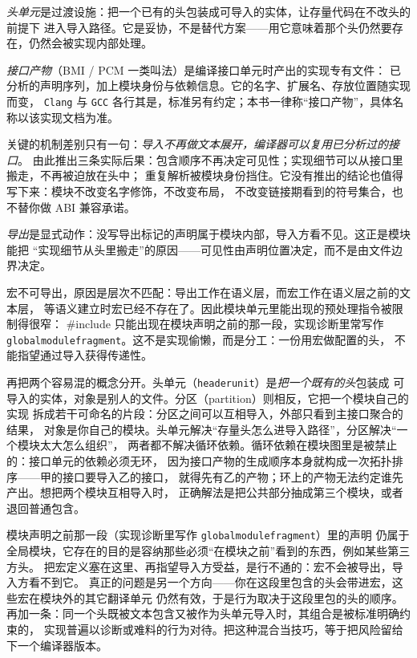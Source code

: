 \documentclass[12pt,a4paper,fontset=fandol]{ctexbook}
\newcommand{\Tp}[1]{\texttt{#1}}
\newcommand{\Bk}{\discretionary{}{}{}}
\newcommand{\Tool}[1]{\texttt{#1}}
\newcommand{\Mx}[1]{\textsf{#1}}
\begin{document}
\emph{头单元}是过渡设施：把一个已有的头包装成可导入的实体，让存量代码在不改头的前提下
进入导入路径。它是妥协，不是替代方案——用它意味着那个头仍然要存在，仍然会被实现内部处理。

\emph{接口产物}（\Mx{BMI} / \Mx{PCM} 一类叫法）是编译接口单元时产出的实现专有文件：
已分析的声明序列，加上模块身份与依赖信息。它的名字、扩展名、存放位置随实现而变，
\Tool{Clang} 与 \Tool{GCC} 各行其是，标准另有约定；本书一律称“接口产物”，具体名称以该实现文档为准。

关键的机制差别只有一句：\emph{导入不再做文本展开，编译器可以复用已分析过的接口}。
由此推出三条实际后果：包含顺序不再决定可见性；实现细节可以从接口里搬走，不再被迫放在头中；
重复解析被模块身份挡住。它没有推出的结论也值得写下来：模块不改变名字修饰，不改变布局，
不改变链接期看到的符号集合，也不替你做 ABI 兼容承诺。

\emph{导出}是显式动作：没写导出标记的声明属于模块内部，导入方看不见。这正是模块能把
“实现细节从头里搬走”的原因——可见性由声明位置决定，而不是由文件边界决定。

宏不可导出，原因是层次不匹配：导出工作在语义层，而宏工作在语义层之前的文本层，
等语义建立时宏已经不存在了。因此模块单元里能出现的预处理指令被限制得很窄：
\#include 只能出现在模块声明之前的那一段，实现诊断里常写作
\Tp{global{\Bk}module{\Bk}fragment}。这不是实现偷懒，而是分工：一份用宏做配置的头，
不能指望通过导入获得传递性。

再把两个容易混的概念分开。头单元（\Tp{header{\Bk}unit}）是\emph{把一个既有的头}包装成
可导入的实体，对象是别人的文件。分区（partition）则相反，它把一个模块自己的实现
拆成若干可命名的片段：分区之间可以互相导入，外部只看到主接口聚合的结果，
对象是你自己的模块。头单元解决“存量头怎么进导入路径”，分区解决“一个模块太大怎么组织”，
两者都不解决循环依赖。循环依赖在模块图里是被禁止的：接口单元的依赖必须无环，
因为接口产物的生成顺序本身就构成一次拓扑排序——甲的接口要导入乙的接口，
就得先有乙的产物；环上的产物无法约定谁先产出。想把两个模块互相导入时，
正确解法是把公共部分抽成第三个模块，或者退回普通包含。

\begin{warning}[title={把宏藏进模块声明之前那一段：可移植性地雷}]
模块声明之前那一段（实现诊断里写作 \Tp{global{\Bk}module{\Bk}fragment}）里的声明
仍属于全局模块，它存在的目的是容纳那些必须“在模块之前”看到的东西，例如某些第三方头。
把宏定义塞在这里、再指望导入方受益，是行不通的：宏不会被导出，导入方看不到它。
真正的问题是另一个方向——你在这段里包含的头会带进宏，这些宏在模块外的其它翻译单元
仍然有效，于是行为取决于这段里包的头的顺序。
再加一条：同一个头既被文本包含又被作为头单元导入时，其组合是被标准明确约束的，
实现普遍以诊断或难料的行为对待。把这种混合当技巧，等于把风险留给下一个编译器版本。
\end{warning}
\end{document}
